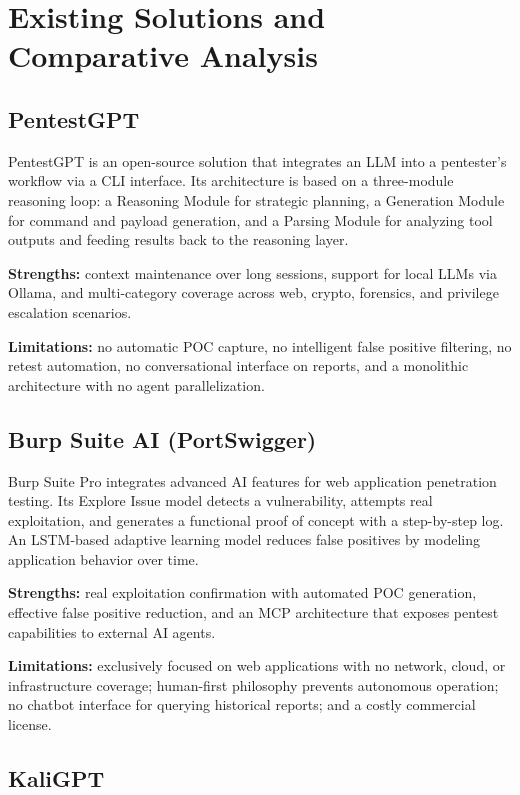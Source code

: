 \documentclass[12pt,a4paper]{report}
\begin{document}
\section{Existing Solutions and Comparative Analysis}

\subsection{PentestGPT}

PentestGPT is an open-source solution that integrates an LLM into a pentester's
workflow via a CLI interface. Its architecture is based on a three-module reasoning
loop: a Reasoning Module for strategic planning, a Generation Module for command
and payload generation, and a Parsing Module for analyzing tool outputs and feeding
results back to the reasoning layer.

\textbf{Strengths:} context maintenance over long sessions, support for local LLMs
via Ollama, and multi-category coverage across web, crypto, forensics, and privilege
escalation scenarios.

\textbf{Limitations:} no automatic POC capture, no intelligent false positive
filtering, no retest automation, no conversational interface on reports, and a
monolithic architecture with no agent parallelization.

\subsection{Burp Suite AI (PortSwigger)}

Burp Suite Pro integrates advanced AI features for web application penetration
testing. Its Explore Issue model detects a vulnerability, attempts real exploitation,
and generates a functional proof of concept with a step-by-step log. An LSTM-based
adaptive learning model reduces false positives by modeling application behavior
over time.

\textbf{Strengths:} real exploitation confirmation with automated POC generation,
effective false positive reduction, and an MCP architecture that exposes pentest
capabilities to external AI agents.

\textbf{Limitations:} exclusively focused on web applications with no network,
cloud, or infrastructure coverage; human-first philosophy prevents autonomous
operation; no chatbot interface for querying historical reports; and a costly
commercial license.

\subsection{KaliGPT}
\end{document}
